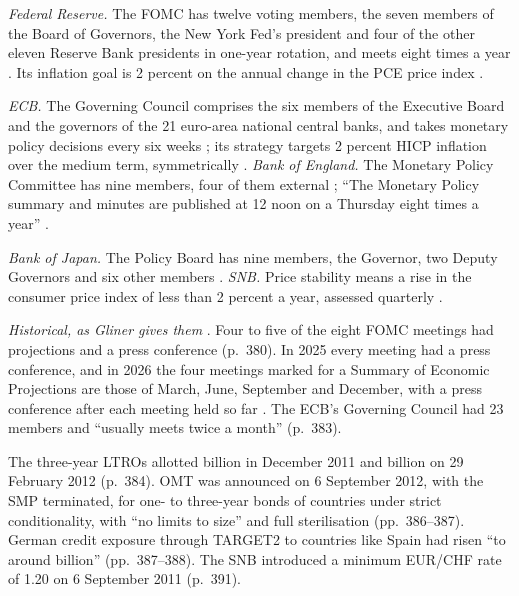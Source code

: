 \begin{qfrule}\label{rule:major-central-banks-current}
 \emph{Federal Reserve.} The FOMC has twelve voting members, the seven members of the Board of Governors, the New York Fed's president and four of the other eleven Reserve Bank presidents in one-year rotation, and meets eight times a year \citep[page updated 7 October 2026]{fomc-page}. Its inflation goal is 2 percent on the annual change in the PCE price index \citep[pp.~1--2]{fomc-longer-run-goals}.

\emph{ECB.} The Governing Council comprises the six members of the Executive Board and the governors of the 21 euro-area national central banks, and takes monetary policy decisions every six weeks \citep[page dated 10 September 2026]{ecb-governing-council}; its strategy targets 2 percent HICP inflation over the medium term, symmetrically \citep[web page]{ecb-strategy}. \emph{Bank of England.} The Monetary Policy Committee has nine members, four of them external \citep[web page]{boe-mpc-page}; ``The Monetary Policy summary and minutes are published at 12 noon on a Thursday eight times a year'' \citep[page last updated 31 January 2023]{boe-mps-minutes}.

\emph{Bank of Japan.} The Policy Board has nine members, the Governor, two Deputy Governors and six other members \citep[web page]{boj-policy-board}. \emph{SNB.} Price stability means a rise in the consumer price index of less than 2 percent a year, assessed quarterly \citep[web page]{snb-strategy}.

 \emph{Historical, as Gliner gives them} \citep[chap.~11, sec.\ ``Central Banks'', PDF pp.~380--393]{s7-gliner}. Four to five of the eight FOMC meetings had projections and a press conference (p.~380). In 2025 every meeting had a press conference, and in 2026 the four meetings marked for a Summary of Economic Projections are those of March, June, September and December, with a press conference after each meeting held so far \citep[2025 and 2026 calendars]{fomc-calendars}. The ECB's Governing Council had 23 members and ``usually meets twice a month'' (p.~383).

The three-year LTROs allotted  billion in December 2011 and  billion on 29 February 2012 (p.~384). OMT was announced on 6 September 2012, with the SMP terminated, for one- to three-year bonds of countries under strict conditionality, with ``no limits to size'' and full sterilisation (pp.~386--387). German credit exposure through TARGET2 to countries like Spain had risen ``to around  billion'' (pp.~387--388). The SNB introduced a minimum EUR/CHF rate of 1.20 on 6 September 2011 (p.~391).


\end{qfrule}

